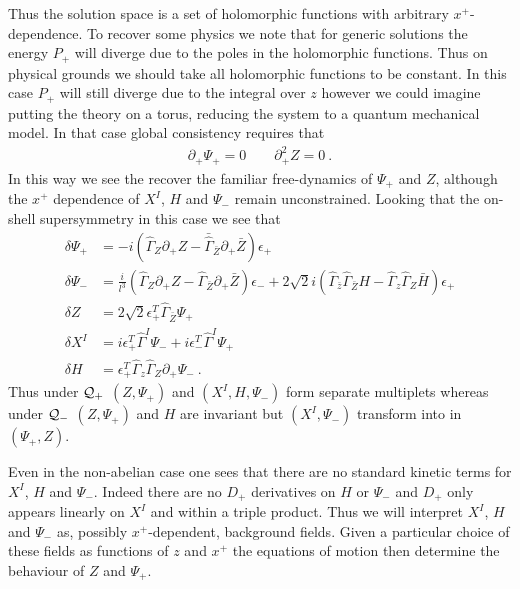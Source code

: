 \documentclass[12pt]{article}
\newcommand{\hG}{{\hat \Gamma}}
\newcommand{\nn}{\nonumber}
\numberwithin{equation}{section}
\begin{document}
Thus the solution space is a set of holomorphic functions with arbitrary $x^+$-dependence. To recover some physics  
we note that for generic solutions the energy $P_+$ will diverge due to the poles in the holomorphic functions. Thus on physical grounds we should take all holomorphic functions to be constant. In this case $P_+$ will still diverge due to the integral over $z$ however we could imagine putting the theory on a torus, reducing the system to a quantum mechanical model. In that case global consistency  requires that
\begin{align}
\partial_+\Psi_+ =0\qquad \partial_+^2Z=0\ .
\end{align}
In this way we see the recover the familiar free-dynamics of $\Psi_+$ and $Z$, although the $x^+$ dependence of $X^I$, $H$ and $\Psi_-$ remain unconstrained. Looking that the on-shell  supersymmetry in this case we see that
\begin{align}
\delta \Psi_+ & = -i({\hG}_Z \partial_+ Z -  {\bar \hG_{\bar Z}}\partial_+ {\bar Z})\epsilon_+
\nn\\
\delta \Psi_- &=  \frac{i}{l^3} \left( \hat{\Gamma}_Z \partial_+ Z - \hat{\Gamma}_{\bar{Z}} \partial_+ \bar{Z}  \right) \epsilon_-    +2 \sqrt{2}i \left( \hat{\Gamma}_{\bar{z}}\hat{\Gamma}_{\bar{Z}} H - \hat{\Gamma}_z  \hat{\Gamma}_Z \bar{H} \right)  \epsilon_+\nn\\
\delta Z & = 2\sqrt{2}\epsilon_+^T{ \hG}_{\bar Z}\Psi_+\nn\\
\delta X^I & =  i \epsilon^T_+ \hat{\Gamma}^I \Psi_- + i \epsilon^T_- \hat{\Gamma}^I \Psi_+\nn\\
\delta H & =  \epsilon^T_+ \hat{\Gamma}_z \hat{\Gamma}_Z \partial_+ \Psi_-   \ .
\end{align}
Thus under ${\cal Q}_+$ $(Z,\Psi_+)$ and $(X^I,H,\Psi_-)$ form separate multiplets whereas under ${\cal Q}_-$ 
$(Z,\Psi_+)$ and $H$ are invariant but $(X^I,\Psi_-)$ transform into in $(\Psi_+,Z)$.

Even in the non-abelian case one sees that there are no standard kinetic terms for $X^I$, $H$ and $\Psi_-$. Indeed there are no $D_+$ derivatives on $H$ or $\Psi_-$ and $D_+$ only appears linearly on $X^I$ and within a triple product. Thus  we will interpret  $X^I$, $H$ and $\Psi_-$  as, possibly $x^+$-dependent, background fields. Given a particular choice of these fields as functions of $z$ and $x^+$ the equations of motion then determine the behaviour of $Z$ and $\Psi_+$.
\end{document}

